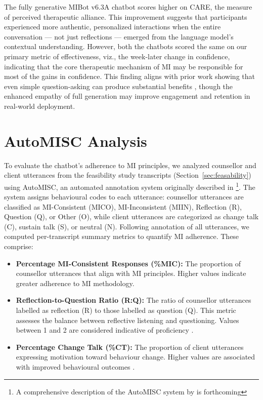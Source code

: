 The fully generative MIBot v6.3A chatbot scores higher on CARE, the measure of perceived therapeutic alliance. This improvement suggests that participants experienced more authentic, personalized interactions when the entire conversation --- not just reflections --- emerged from the language model's contextual understanding. However, both the chatbots scored the same on our primary metric of effectiveness, viz., the week-later change in confidence, indicating that the core therapeutic mechanism of MI may be responsible for most of the gains in confidence. This finding aligns with prior work showing that even simple question-asking can produce substantial benefits \citep{brown2023mi}, though the enhanced empathy of full generation may improve engagement and retention in real-world deployment.

\section{AutoMISC Analysis}
\label{sec:mi-adherence}

To evaluate the chatbot's adherence to MI principles, we analyzed counsellor and client utterances from the feasibility study transcripts (Section~\ref{sec:feasability}) using AutoMISC, an automated annotation system originally described in \citet{mahmood-etal-2025-fully}\footnote{A comprehensive description of the AutoMISC system by \citet{ali2025automated} is forthcoming}.
The system assigns behavioural codes to each utterance: counsellor utterances are classified as MI-Consistent (MICO), MI-Inconsistent (MIIN), Reflection (R), Question (Q), or Other (O), while client utterances are categorized as change talk (C), sustain talk (S), or neutral (N). Following annotation of all utterances, we computed per-transcript summary metrics to quantify MI adherence. These comprise:

\begin{itemize}

    \item \textbf{Percentage MI-Consistent Responses (\%MIC):} The proportion of counsellor utterances that align with MI principles. Higher values indicate greater adherence to MI methodology.
    
    \item \textbf{Reflection-to-Question Ratio (R:Q):} The ratio of counsellor utterances labelled as reflection (R) to those labelled as question (Q). This metric assesses the balance between reflective listening and questioning. Values between 1 and 2 are considered indicative of proficiency \citep{moyers2016miti}.

    \item \textbf{Percentage Change Talk (\%CT):} The proportion of client utterances expressing motivation toward behaviour change. Higher values are associated with improved behavioural outcomes \citep{apodaca2009}.

\end{itemize}

